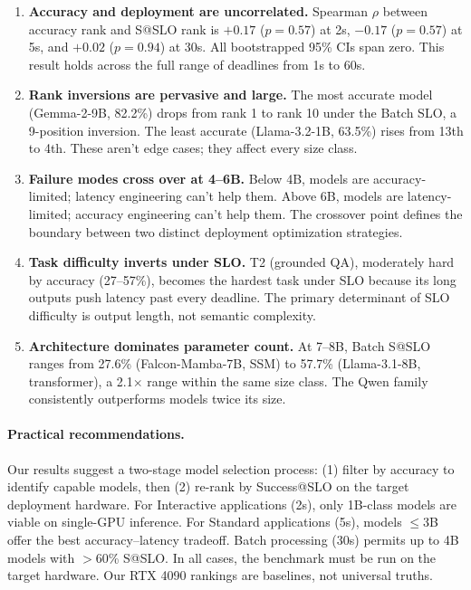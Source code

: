 \documentclass[11pt]{article}
\begin{document}
\begin{enumerate}[leftmargin=*]
\item \textbf{Accuracy and deployment are uncorrelated.} Spearman $\rho$ between accuracy rank and S@SLO rank is $+0.17$ ($p = 0.57$) at 2s, $-0.17$ ($p = 0.57$) at 5s, and $+0.02$ ($p = 0.94$) at 30s.  All bootstrapped 95\% CIs span zero.  This result holds across the full range of deadlines from 1s to 60s.

\item \textbf{Rank inversions are pervasive and large.} The most accurate model (Gemma-2-9B, 82.2\%) drops from rank 1 to rank 10 under the Batch SLO, a 9-position inversion.  The least accurate (Llama-3.2-1B, 63.5\%) rises from 13th to 4th.  These aren't edge cases; they affect every size class.

\item \textbf{Failure modes cross over at 4--6B.} Below 4B, models are accuracy-limited; latency engineering can't help them.  Above 6B, models are latency-limited; accuracy engineering can't help them.  The crossover point defines the boundary between two distinct deployment optimization strategies.

\item \textbf{Task difficulty inverts under SLO.} T2 (grounded QA), moderately hard by accuracy (27--57\%), becomes the hardest task under SLO because its long outputs push latency past every deadline.  The primary determinant of SLO difficulty is output length, not semantic complexity.

\item \textbf{Architecture dominates parameter count.} At 7--8B, Batch S@SLO ranges from 27.6\% (Falcon-Mamba-7B, SSM) to 57.7\% (Llama-3.1-8B, transformer), a 2.1$\times$ range within the same size class.  The Qwen family consistently outperforms models twice its size.
\end{enumerate}

\paragraph{Practical recommendations.} Our results suggest a two-stage model selection process: (1) filter by accuracy to identify capable models, then (2) re-rank by Success@SLO on the target deployment hardware.  For Interactive applications (2s), only 1B-class models are viable on single-GPU inference.  For Standard applications (5s), models $\leq$3B offer the best accuracy--latency tradeoff.  Batch processing (30s) permits up to 4B models with $>$60\% S@SLO.  In all cases, the benchmark must be run on the target hardware.  Our RTX 4090 rankings are baselines, not universal truths.
\end{document}
